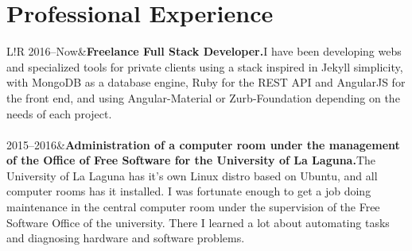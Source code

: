 \documentclass[10pt]{article}
\newcommand\VRule{\color{lightgray}\vrule width 0.5pt}
\begin{document}
    \section*{Professional Experience}
    \begin{tabular}{L!{\VRule}R}
        2016--Now&{{\bf Freelance Full Stack Developer.}\newline I have been developing webs and specialized tools for private clients using a stack inspired in Jekyll simplicity, with MongoDB as a database engine, Ruby for the REST API and AngularJS for the front end, and using Angular-Material or Zurb-Foundation depending on the needs of each project.}\\\\

        2015--2016&{{\bf Administration of a computer room under the management of the Office of Free Software for the University of La Laguna.}\newline The University of La Laguna has it's own Linux distro based on Ubuntu, and all computer rooms has it installed. I was fortunate enough to get a job doing maintenance in the central computer room under the supervision of the Free Software Office of the university. There I learned a lot about automating tasks and diagnosing hardware and software problems.}\\\\

    \end{tabular}
\end{document}

